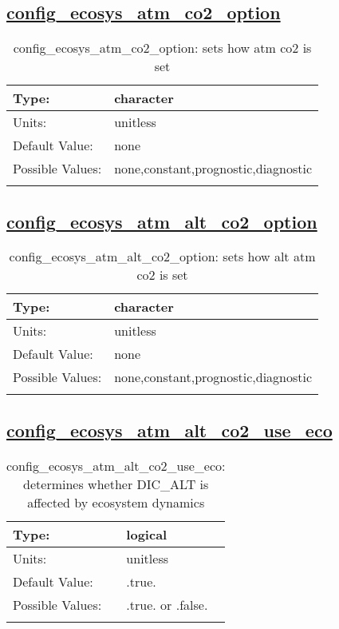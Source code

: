 \subsection[config\_ecosys\_atm\_co2\_option]{\hyperref[sec:nm_tab_tracer_forcing_ecosysTracers]{config\_ecosys\_atm\_co2\_option}}
\label{subsec:nm_sec_config_ecosys_atm_co2_option}
\begin{center}
\begin{longtable}{| p{2.0in} || p{4.0in} |}
    \hline
    Type: & character \\
    \hline
    Units: & \si{unitless} \\
    \hline
    Default Value: & none \\
    \hline
    Possible Values: & none,constant,prognostic,diagnostic \\
    \hline
    \caption{config\_ecosys\_atm\_co2\_option: sets how atm co2 is set}
\end{longtable}
\end{center}
\subsection[config\_ecosys\_atm\_alt\_co2\_option]{\hyperref[sec:nm_tab_tracer_forcing_ecosysTracers]{config\_ecosys\_atm\_alt\_co2\_option}}
\label{subsec:nm_sec_config_ecosys_atm_alt_co2_option}
\begin{center}
\begin{longtable}{| p{2.0in} || p{4.0in} |}
    \hline
    Type: & character \\
    \hline
    Units: & \si{unitless} \\
    \hline
    Default Value: & none \\
    \hline
    Possible Values: & none,constant,prognostic,diagnostic \\
    \hline
    \caption{config\_ecosys\_atm\_alt\_co2\_option: sets how alt atm co2 is set}
\end{longtable}
\end{center}
\subsection[config\_ecosys\_atm\_alt\_co2\_use\_eco]{\hyperref[sec:nm_tab_tracer_forcing_ecosysTracers]{config\_ecosys\_atm\_alt\_co2\_use\_eco}}
\label{subsec:nm_sec_config_ecosys_atm_alt_co2_use_eco}
\begin{center}
\begin{longtable}{| p{2.0in} || p{4.0in} |}
    \hline
    Type: & logical \\
    \hline
    Units: & \si{unitless} \\
    \hline
    Default Value: & .true. \\
    \hline
    Possible Values: & .true. or .false. \\
    \hline
    \caption{config\_ecosys\_atm\_alt\_co2\_use\_eco: determines whether DIC\_ALT is affected by ecosystem dynamics}
\end{longtable}
\end{center}
